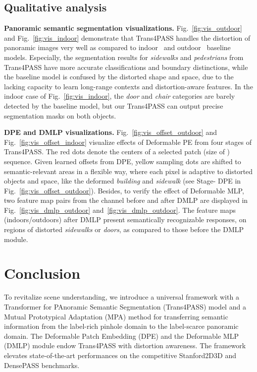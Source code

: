 \documentclass[final]{cvpr}
\begin{document}
\subsection{Qualitative analysis}
\noindent\textbf{Panoramic semantic segmentation visualizations.}
Fig.~\ref{fig:vis_outdoor} and Fig.~\ref{fig:vis_indoor} demonstrate that Trans4PASS handles the distortion of panoramic images very well as compared to indoor~\cite{pvt} and outdoor~\cite{segformer} baseline models. Especially, the segmentation results for \emph{sidewalks} and \emph{pedestrians} from Trans4PASS have more accurate classifications and boundary distinctions, while the baseline model is confused by the distorted shape and space, due to the lacking capacity to learn long-range contexts and distortion-aware features. In the indoor case of Fig.~\ref{fig:vis_indoor}, the \emph{door} and \emph{chair} categories are barely detected by the baseline model, but our Trans4PASS can output precise segmentation masks on both objects.

\noindent\textbf{DPE and DMLP visualizations.}
Fig.~\ref{fig:vis_offset_outdoor} and Fig.~\ref{fig:vis_offset_indoor} visualize effects of Deformable PE from four stages of Trans4PASS. The red dots denote the centers of a selected patch (size of ) sequence. Given learned offsets from DPE,  yellow sampling dots are shifted to semantic-relevant areas in a flexible way,
where each pixel is adaptive to distorted objects and space, like the deformed \emph{building} and \emph{sidewalk} (see Stage- DPE in Fig.~\ref{fig:vis_offset_outdoor}). Besides, to verify the effect of Deformable MLP, two feature map pairs from the  channel before and after DMLP are displayed in Fig.~\ref{fig:vis_dmlp_outdoor} and~\ref{fig:vis_dmlp_outdoor}. The feature maps (indoors/outdoors)
after DMLP present semantically recognizable responses, \eg on regions of distorted \emph{sidewalks} or \emph{doors}, as compared to those before the DMLP module.

\section{Conclusion}
To revitalize  scene understanding, we introduce a universal framework with a Transformer for PAnoramic Semantic Segmentation (Trans4PASS) model and a Mutual Prototypical Adaptation (MPA) method for transferring semantic information from the label-rich pinhole domain to the label-scarce panoramic domain. The Deformable Patch Embedding (DPE) and the Deformable MLP (DMLP) module endow Trans4PASS with distortion awareness. 
The framework elevates state-of-the-art performances on the competitive Stanford2D3D and DensePASS benchmarks.
\end{document}
